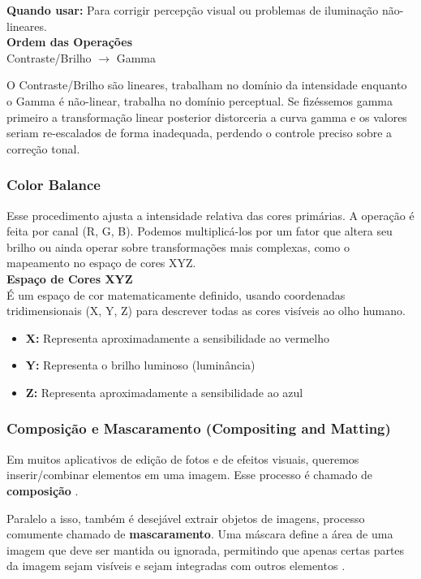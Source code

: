 \documentclass[12pt, a4paper]{article}
\begin{document}
\noindent\textbf{Quando usar:} Para corrigir percepção visual ou problemas de iluminação não-lineares. \\

\noindent \textbf{Ordem das Operações} \\

Contraste/Brilho $\rightarrow$ Gamma

O Contraste/Brilho são lineares, trabalham no domínio da intensidade enquanto o Gamma é não-linear, trabalha no domínio perceptual. Se fizéssemos gamma primeiro a transformação linear posterior distorceria a curva gamma e os valores seriam re-escalados de forma inadequada, perdendo o controle preciso sobre a correção tonal.

\subsubsection{Color Balance}
Esse procedimento ajusta a intensidade relativa das cores primárias. A operação é feita por canal (R, G, B). Podemos multiplicá-los por um fator que altera seu brilho ou ainda operar sobre transformações mais complexas, como o mapeamento no espaço de cores XYZ. \\

\noindent\textbf{Espaço de Cores XYZ}\\

É um espaço de cor matematicamente definido, usando coordenadas tridimensionais (X, Y, Z) para descrever todas as cores visíveis ao olho humano.
\begin{itemize}
    \item \textbf{X:} Representa aproximadamente a sensibilidade ao vermelho
    \item \textbf{Y:} Representa o brilho luminoso (luminância)
    \item \textbf{Z:} Representa aproximadamente a sensibilidade ao azul
\end{itemize}

\subsubsection{Composição e Mascaramento (Compositing and Matting)}

Em muitos aplicativos de edição de fotos e de efeitos visuais, queremos inserir/combinar elementos em uma imagem. Esse processo é chamado de \textbf{composição} \cite{SmithAndBlinn:1996:BSM}.

Paralelo a isso, também é desejável extrair objetos de imagens, processo comumente chamado de \textbf{mascaramento}. Uma máscara define a área de uma imagem que deve ser mantida ou ignorada, permitindo que apenas certas partes da imagem sejam visíveis e sejam integradas com outros elementos \cite{Porter:1984:CDI, SmithAndBlinn:1996:BSM}. \\
\end{document}
